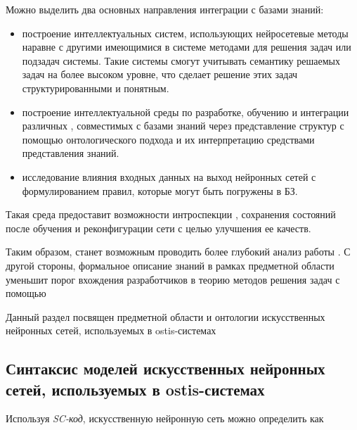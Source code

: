 Можно выделить два основных направления интеграции  с базами знаний:

\begin{itemize}
	\item построение интеллектуальных систем, использующих нейросетевые методы наравне с другими имеющимися в системе методами для решения задач или подзадач системы. Такие системы смогут учитывать семантику решаемых задач на более высоком уровне, что сделает решение этих задач структурированными и понятным.

	\item построение интеллектуальной среды по разработке, обучению и интеграции различных , совместимых с базами знаний через представление структур  с помощью онтологического подхода и их интерпретацию средствами представления знаний.
	
	\item исследование влияния входных данных на выход нейронных сетей с формулированием правил, которые могут быть погружены в БЗ.
\end{itemize}

Такая среда предоставит возможности интроспекции , сохранения состояний  после обучения и реконфигурации сети с целью улучшения ее качеств.

Таким образом, станет возможным проводить более глубокий анализ работы . С другой стороны, формальное описание знаний в рамках предметной области  уменьшит порог вхождения разработчиков в теорию методов решения задач с помощью 

Данный раздел посвящен предметной области и онтологии искусственных нейронных сетей, используемых в ostis-системах

\subsection{Синтаксис моделей искусственных нейронных сетей, используемых в ostis-системах}

Используя \textit{SC-код}, искусственную нейронную сеть можно определить как 

\begin{SCn}
\end{SCn}

